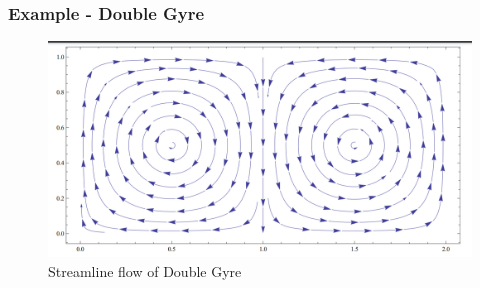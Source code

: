 \documentclass[../presentation.tex]{subfiles}
\begin{document}
\begin{frame}
  \frametitle{Example - Double Gyre}
  \begin{figure}
    \centering
    \includegraphics[width=\linewidth]{images/image_2.png}
    \caption{Streamline flow of Double Gyre}
    \label{figg:fig_2}
  \end{figure}
\end{frame}
\end{document}
